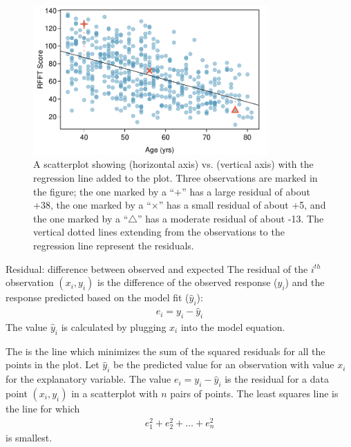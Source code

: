 \begin{figure}[h]
	\centering
	\includegraphics[width=0.8\textwidth]
	{ch_simple_linear_regression_oi_biostat/figures/prevendResid/prevendResid.pdf}
	\caption{A scatterplot showing  (horizontal axis) vs.  (vertical axis) with the regression line added to the plot. Three observations are marked in the figure; the one marked by a ``$+$'' has a large residual of about +38, the one marked by a ``$\times$'' has a small residual of about +5, and the one marked by a ``$\triangle$'' has a moderate residual of about -13. The vertical dotted lines extending from the observations to the regression line represent the residuals.}
	\label{prevendResid}
\end{figure}


\textD{\newpage}

\begin{onebox}{Residual: difference between observed and expected}
The residual of the $i^{th}$ observation $(x_i, y_i)$ is the difference of the observed response ($y_i$) and the response predicted based on the model fit ($\widehat{y}_i$):
\begin{eqnarray*}
e_i = y_i - \widehat{y}_i
\end{eqnarray*}
The value $\widehat{y}_i$ is calculated by plugging $x_i$ into the model equation.
\end{onebox}

The  is the line which minimizes the sum of the squared residuals for all the points in the plot.  Let $\hat{y}_i$ be the predicted value for an observation with value $x_i$ for the explanatory variable.  The value $e_i = y_i - \hat{y}_i$ is the residual for a data point $(x_i, y_i)$ in a scatterplot with $n$ pairs of points.  The least squares line is the line for which
\begin{eqnarray}
e_{1}^2 + e_{2}^2 + \dots + e_{n}^2
\label{sumOfSquaresForResiduals}
\end{eqnarray}
is smallest. 

